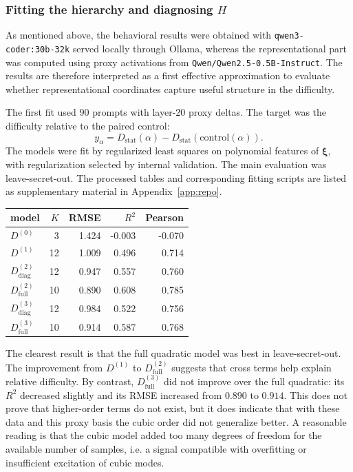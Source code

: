 \documentclass[10pt,twocolumn]{article}
\newcommand{\xrep}{\bm{\xi}}
\begin{document}
\subsubsection*{Fitting the hierarchy and diagnosing \texorpdfstring{\(H\)}{H}}

As mentioned above, the behavioral results were obtained with \texttt{qwen3-coder:30b-32k} served locally through Ollama, whereas the representational part was computed using proxy activations from \texttt{Qwen/Qwen2.5-0.5B-Instruct}. The results are therefore interpreted as a first effective approximation to evaluate whether representational coordinates capture useful structure in the difficulty.

The first fit used \(90\) prompts with layer-\(20\) proxy deltas. The target was the difficulty relative to the paired control:
\[
y_\alpha
=
D_{\mathrm{stat}}(\alpha)
-
D_{\mathrm{stat}}(\mathrm{control}(\alpha)).
\]
The models were fit by regularized least squares on polynomial features of \(\xrep\), with regularization selected by internal validation. The main evaluation was leave-secret-out. The processed tables and corresponding fitting scripts are listed as supplementary material in Appendix~\ref{app:repo}.

\begin{center}
\scriptsize
\begin{tabular}{@{}lrrrr@{}}
\toprule
model & \(K\) & RMSE & \(R^2\) & Pearson \\
\midrule
\(D^{(0)}\) & 3 & 1.424 & -0.003 & -0.070 \\
\(D^{(1)}\) & 12 & 1.009 & 0.496 & 0.714 \\
\(D^{(2)}_{\mathrm{diag}}\) & 12 & 0.947 & 0.557 & 0.760 \\
\(D^{(2)}_{\mathrm{full}}\) & 10 & 0.890 & 0.608 & 0.785 \\
\(D^{(3)}_{\mathrm{diag}}\) & 12 & 0.984 & 0.522 & 0.756 \\
\(D^{(3)}_{\mathrm{full}}\) & 10 & 0.914 & 0.587 & 0.768 \\
\bottomrule
\end{tabular}
\end{center}

The clearest result is that the full quadratic model was best in leave-secret-out. The improvement from \(D^{(1)}\) to \(D^{(2)}_{\mathrm{full}}\) suggests that cross terms help explain relative difficulty. By contrast, \(D^{(3)}_{\mathrm{full}}\) did not improve over the full quadratic: its \(R^2\) decreased slightly and its RMSE increased from \(0.890\) to \(0.914\). This does not prove that higher-order terms do not exist, but it does indicate that with these data and this proxy basis the cubic order did not generalize better. A reasonable reading is that the cubic model added too many degrees of freedom for the available number of samples, i.e. a signal compatible with overfitting or insufficient excitation of cubic modes.
\end{document}
